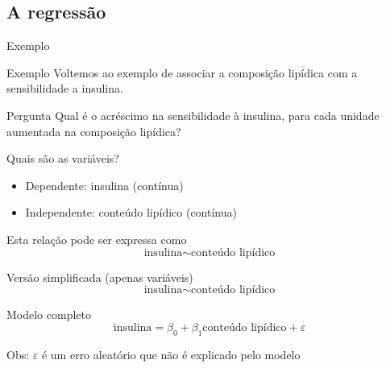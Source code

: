 \documentclass{beamer}
\begin{document}
\subsection{A regressão}

\begin{frame}{Exemplo}
  \begin{exampleblock}{Exemplo}
    Voltemos ao exemplo de associar a composição lipídica com a sensibilidade a insulina.    
  \end{exampleblock}
  \begin{block}{Pergunta}
    Qual é o acréscimo na sensibilidade à insulina, para cada unidade aumentada na composição lipídica?
  \end{block}
\end{frame}

\begin{frame}{Quais são as variáveis?}
  \begin{itemize}
  \item Dependente: insulina (contínua)
  \item Independente: conteúdo lipídico (contínua)
  \end{itemize}
  \vfill
  \begin{block}{Esta relação pode ser expressa como}
    \begin{displaymath}
      \text{insulina} \sim \text{conteúdo lipídico}
    \end{displaymath}
  \end{block}
\end{frame}

\begin{frame}
    \begin{block}{Versão simplificada (apenas variáveis)}
    \begin{displaymath}
      \text{insulina} \sim \text{conteúdo lipídico}
    \end{displaymath}
  \end{block}
  \begin{block}{Modelo completo}
    \begin{displaymath}
      \text{insulina} =\beta_0 + \beta_1 \text{conteúdo lipídico} + \varepsilon
    \end{displaymath}
  \end{block}
  Obs: $\varepsilon$ é um erro aleatório que não é explicado pelo modelo
\end{frame}
\end{document}
